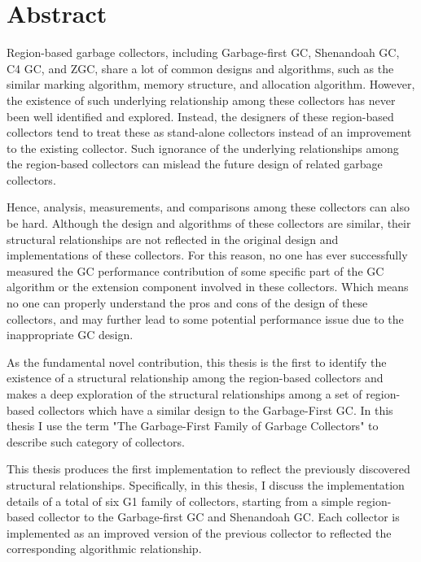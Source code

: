 \chapter*{Abstract}
\vspace{-1em}


Region-based garbage collectors, including Garbage-first GC, Shenandoah GC, C4 GC, and ZGC,
share a lot of common designs and algorithms, such as
the similar marking algorithm, memory structure, and allocation algorithm.
However, the existence of such underlying relationship among these collectors
has never been well identified and explored.
Instead, the designers of these region-based collectors tend to treat these as
stand-alone collectors instead of an improvement to the existing collector.
Such ignorance of the underlying relationships among the region-based collectors
can mislead the future design of related garbage collectors. 

Hence, analysis, measurements, and comparisons among these collectors can also be hard.
Although the design and algorithms of these collectors are similar,
their structural relationships are not reflected in the
original design and implementations of these collectors.
For this reason, no one has ever successfully measured
the GC performance contribution of some specific part of the GC algorithm or the extension component involved
in these collectors.
Which means no one can properly understand the pros and cons
of the design of these collectors, and may further lead to some potential performance
issue due to the inappropriate GC design.


As the fundamental novel contribution, this thesis is the first to identify the existence of a
structural relationship among the region-based collectors and makes a deep exploration
of the structural relationships among a set of region-based collectors which have a similar
design to the Garbage-First GC. In this thesis I use the term
"The Garbage-First Family of Garbage Collectors" to describe such category of collectors.

This thesis produces the first implementation to reflect the previously
discovered structural relationships.
Specifically, in this thesis, I discuss the implementation details of a total of six G1 family
of collectors, starting from a simple region-based
collector to the Garbage-first GC and Shenandoah GC.
Each collector is implemented as an improved version of the previous collector to reflected
the corresponding algorithmic relationship.

